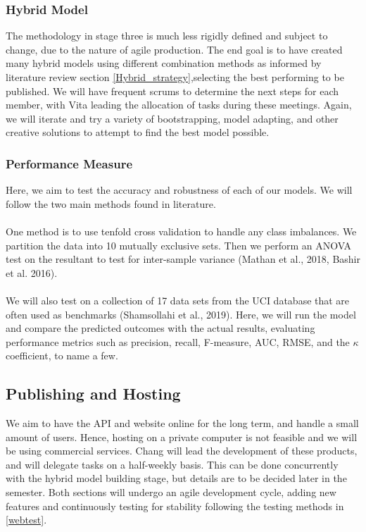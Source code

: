 \documentclass[a4paper, 12pt]{article}
\begin{document}
        \subsubsection{Hybrid Model}
        The methodology in stage three is much less rigidly defined and subject to change, due to the nature of agile production. The end goal is to have created many hybrid models using different combination methods as informed by literature review section \ref{Hybrid_strategy},selecting the best performing to be published.
        We will have frequent scrums to determine the next steps for each member, with Vita leading the allocation of tasks during these meetings. Again, we will iterate and try a variety of bootstrapping, model adapting, and other creative solutions to attempt to find the best model possible.
        
        \subsubsection{Performance Measure} \label{perf_measure}
        Here, we aim to test the accuracy and robustness of each of our models. We will follow the two main methods found in literature.\\\\
        One method is to use tenfold cross validation to handle any class imbalances. We partition the data into 10 mutually exclusive sets. Then we perform an ANOVA test on the resultant to test for inter-sample variance (Mathan et al., 2018, Bashir et al. 2016).
        \\\\
        We will also test on a collection of 17 data sets from the UCI database that are often used as benchmarks (Shamsollahi et al., 2019). Here, we will run the model and compare the predicted outcomes with the actual results, evaluating performance metrics such as precision, recall, F-measure, AUC, RMSE, and the $\kappa$ coefficient, to name a few.
        
    \subsection{Publishing and Hosting}
    We aim to have the API and website online for the long term, and handle a small amount of users. Hence, hosting on a private computer is not feasible and we will be using commercial services. Chang will lead the development of these products, and will delegate tasks on a half-weekly basis. This can be done concurrently with the hybrid model building stage, but details are to be decided later in the semester. Both sections will undergo an agile development cycle, adding new features and continuously testing for stability following the testing methods in \ref{webtest}.
\end{document}

